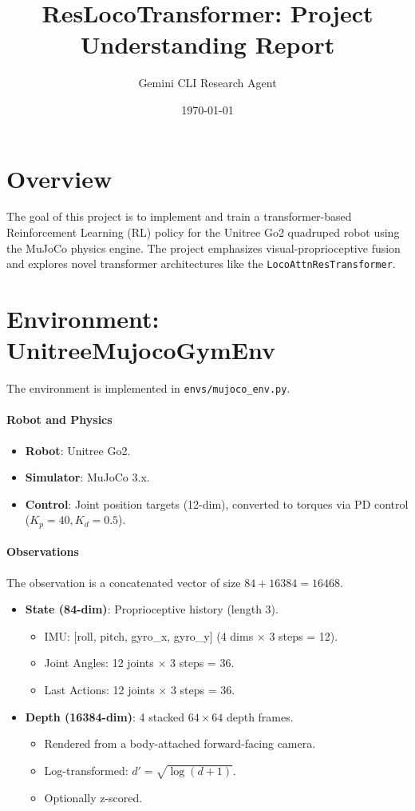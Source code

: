 \documentclass{article}
\title{ResLocoTransformer: Project Understanding Report}
\author{Gemini CLI Research Agent}
\date{\today}
\begin{document}
\maketitle

\section{Overview}
The goal of this project is to implement and train a transformer-based Reinforcement Learning (RL) policy for the Unitree Go2 quadruped robot using the MuJoCo physics engine. The project emphasizes visual-proprioceptive fusion and explores novel transformer architectures like the \texttt{LocoAttnResTransformer}.

\section{Environment: UnitreeMujocoGymEnv}
The environment is implemented in \texttt{envs/mujoco_env.py}.

\paragraph{Robot and Physics}
\begin{itemize}
    \item \textbf{Robot}: Unitree Go2.
    \item \textbf{Simulator}: MuJoCo 3.x.
    \item \textbf{Control}: Joint position targets (12-dim), converted to torques via PD control ($K_p=40, K_d=0.5$).
\end{itemize}

\paragraph{Observations}
The observation is a concatenated vector of size $84 + 16384 = 16468$.
\begin{itemize}
    \item \textbf{State (84-dim)}: Proprioceptive history (length 3).
    \begin{itemize}
        \item IMU: [roll, pitch, gyro_x, gyro_y] (4 dims $\times$ 3 steps = 12).
        \item Joint Angles: 12 joints $\times$ 3 steps = 36.
        \item Last Actions: 12 joints $\times$ 3 steps = 36.
    \end{itemize}
    \item \textbf{Depth (16384-dim)}: 4 stacked $64 \times 64$ depth frames.
    \begin{itemize}
        \item Rendered from a body-attached forward-facing camera.
        \item Log-transformed: $d' = \sqrt{\log(d+1)}$.
        \item Optionally z-scored.
    \end{itemize}
\end{itemize}
\end{document}
